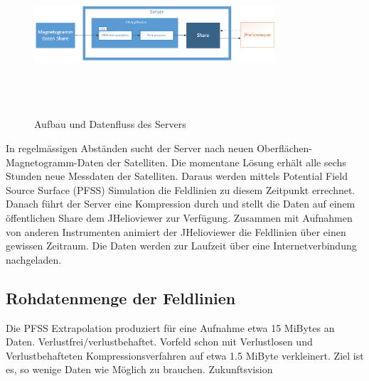 \begin{figure}[!htbp]
\center
	\includegraphics[width=0.8\textwidth,height=6cm,keepaspectratio]{./pictures/einleitung/server.png}
	\caption{Aufbau und Datenfluss des Servers}
	\label{einleitung::aufbau}
\end{figure}
In regelmässigen Abständen sucht der Server nach neuen Oberflächen-Magnetogramm-Daten der Satelliten. Die momentane Lösung erhält alle sechs Stunden neue Messdaten der Satelliten. Daraus werden mittels Potential Field Source Surface (PFSS) Simulation die Feldlinien zu diesem Zeitpunkt errechnet. Danach führt der Server eine Kompression durch und stellt die Daten auf einem öffentlichen Share dem JHelioviewer zur Verfügung. Zusammen mit Aufnahmen von anderen Instrumenten animiert der JHelioviewer die Feldlinien über einen gewissen Zeitraum. Die Daten werden zur Laufzeit über eine Internetverbindung nachgeladen.

\subsection{Rohdatenmenge der Feldlinien}
Die PFSS Extrapolation produziert für eine Aufnahme etwa 15 MiBytes an Daten.
Verlustfrei/verlustbehaftet.
Vorfeld schon mit Verlustlosen und Verlustbehafteten Kompressionsverfahren auf etwa 1.5 MiByte verkleinert.
Ziel ist es, so wenige Daten wie Möglich zu brauchen. Zukunftsvision




 